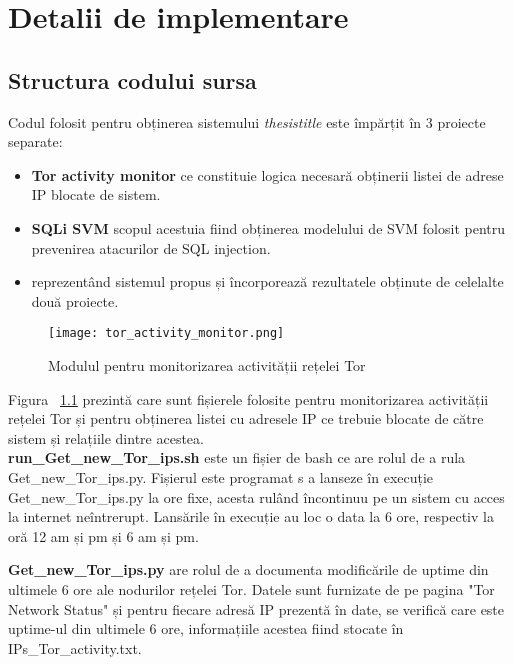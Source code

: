  \chapter{Detalii de implementare}
\label{cap:implementare}


\section{Structura codului sursa}

Codul folosit pentru obținerea sistemului \textit{thesistitle} este împărțit în 3 proiecte separate: 
\begin{itemize}
	\item \textbf {Tor activity monitor} ce constituie logica necesară obținerii listei de adrese IP blocate de sistem. 
	\item \textbf{SQLi SVM} scopul acestuia fiind obținerea modelului de SVM folosit pentru prevenirea atacurilor de SQL injection. 
	\item \textbf{\thesistitle} reprezentând sistemul propus și încorporează rezultatele obținute de celelalte două proiecte. 
\end{itemize}

\begin{figure}[h]
	\centering
	\texttt{[image: tor\_activity\_monitor.png]}
	\caption{Modulul pentru monitorizarea  activității rețelei Tor}
	\label{fig:tor_activity_monitor}
\end{figure}

Figura ~\ref{fig:tor_activity_monitor}  prezintă care sunt fișierele folosite pentru monitorizarea activității rețelei Tor și pentru obținerea listei cu adresele IP ce trebuie blocate de către sistem și relațiile dintre acestea. \\

\textbf{run\_Get\_new\_Tor\_ips.sh} este un fișier de bash ce are rolul de a rula Get\_new\_Tor\_ips.py. Fișierul este programat s a lanseze în execuție  Get\_new\_Tor\_ips.py  la ore fixe, acesta rulând încontinuu pe un sistem cu acces la internet neîntrerupt. Lansările în execuție au loc o data la 6 ore, respectiv la oră 12 am și pm și 6 am și pm. 

\textbf{Get\_new\_Tor\_ips.py}  are rolul de a documenta modificările de uptime din ultimele 6 ore ale nodurilor rețelei Tor. Datele sunt furnizate de pe pagina "Tor Network Status" \cite{tot_status} și pentru fiecare adresă IP prezentă în date, se verifică care este uptime-ul din ultimele 6 ore, informațiile acestea fiind stocate în  IPs\_Tor\_activity.txt.

